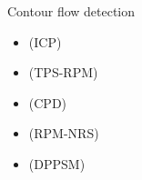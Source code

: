 \begin{frame}{Contour flow detection}
  \begin{itemize}
    \item<1-> \cite{besl1992method, feldmar1996rigid} (ICP)
    \item<2-> \cite{chui2000new} (TPS-RPM)
    \item<3-> \cite{myronenko2010point} (CPD)
    \item<4-> \cite{zheng2006robust} (RPM-NRS)
    \item<5-> \cite{lian2012rotation} (DPPSM)
  \end{itemize}
  \begin{overlayarea}{\textwidth}{\textheight}
\end{overlayarea}
\end{frame}
